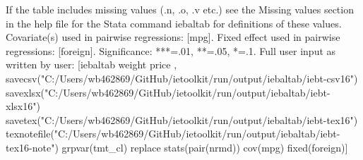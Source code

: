 If the table includes missing values (.n, .o, .v etc.) see the Missing values section in the help file for the Stata command iebaltab for definitions of these values. Covariate(s) used in pairwise regressions: [mpg]. Fixed effect used in pairwise regressions: [foreign]. Significance: ***=.01, **=.05, *=.1. Full user input as written by user: [iebaltab weight price , savecsv("C:/Users/wb462869/GitHub/ietoolkit/run/output/iebaltab/iebt-csv16") savexlsx("C:/Users/wb462869/GitHub/ietoolkit/run/output/iebaltab/iebt-xlsx16") savetex("C:/Users/wb462869/GitHub/ietoolkit/run/output/iebaltab/iebt-tex16") texnotefile("C:/Users/wb462869/GitHub/ietoolkit/run/output/iebaltab/iebt-tex16-note") grpvar(tmt\_cl) replace stats(pair(nrmd)) cov(mpg) fixed(foreign)]

